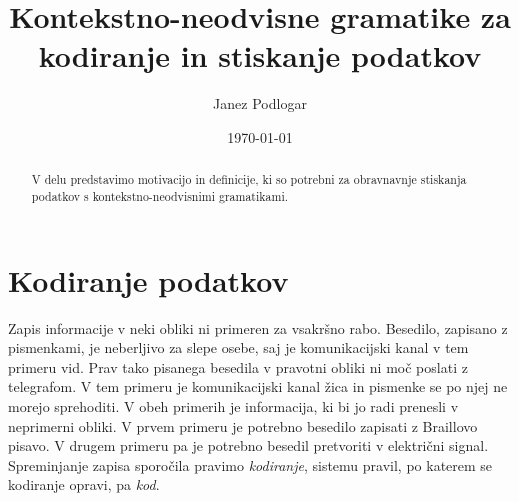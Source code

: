 \documentclass{amsart}
\title{Kontekstno-neodvisne gramatike za kodiranje in stiskanje podatkov}
\author{Janez Podlogar}
\date{\today}
\theoremstyle{definition} %
\theoremstyle{plain} %
\begin{document}
\begin{abstract}

    V delu predstavimo motivacijo in definicije, ki so potrebni za obravnavnje
    stiskanja podatkov s kontekstno-neodvisnimi gramatikami.

\end{abstract}

\maketitle

\section{Kodiranje podatkov}

Zapis informacije v neki obliki ni primeren za vsakršno rabo. Besedilo, zapisano z 
pismenkami, je neberljivo za slepe osebe, saj je komunikacijski kanal v tem primeru
vid. Prav tako pisanega besedila v pravotni obliki ni moč poslati z telegrafom. V tem
primeru je komunikacijski kanal žica in pismenke se po njej ne morejo sprehoditi. V obeh 
primerih je informacija, ki bi jo radi prenesli v neprimerni obliki. V prvem 
primeru je potrebno besedilo zapisati z Braillovo pisavo. V drugem primeru pa je 
potrebno besedil pretvoriti v električni signal. Spreminjanje zapisa sporočila
pravimo \textit{kodiranje}, sistemu pravil, po katerem se kodiranje opravi,
pa \textit{kod}. 
\end{document}
